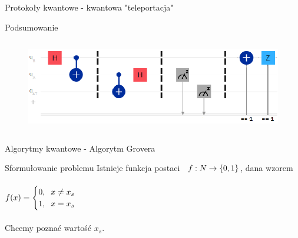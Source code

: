 \documentclass{beamer}
\begin{document}
\begin{frame}{Protokoły kwantowe - kwantowa "teleportacja"}
{\begin{block}{Podsumowanie}
\begin{columns}
					\begin{column}{0.65\textwidth}
						\begin{flushleft}
							\begin{figure}
								\includegraphics[scale=0.25]{media/QantumTeleportationCircuit.png}
							\end{figure}			
						\end{flushleft}	
					\end{column}
				\end{columns}
				\vspace{0.5em}
			\end{block}
		}
	\end{frame}

	\begin{frame}{Algorytmy kwantowe - Algorytm Grovera}
		\begin{block}{Sformułowanie problemu}
			\vspace{0.5em}
			Istnieje funkcja postaci 
			$\hspace{0.2cm}f:N\rightarrow \{0,1\}$, dana wzorem\\~\\
			\centering
			$
			f(x)=
			\begin{cases}
			0,\hspace{0.2cm} x \neq x_{s}\\
			1,\hspace{0.2cm} x = x_{s}\\
			\end{cases}
			\vspace{0.5em}
			$\\~\\
			Chcemy poznać wartość $x_{s}$.
		\end{block}
	\end{frame}
	
\end{document}
